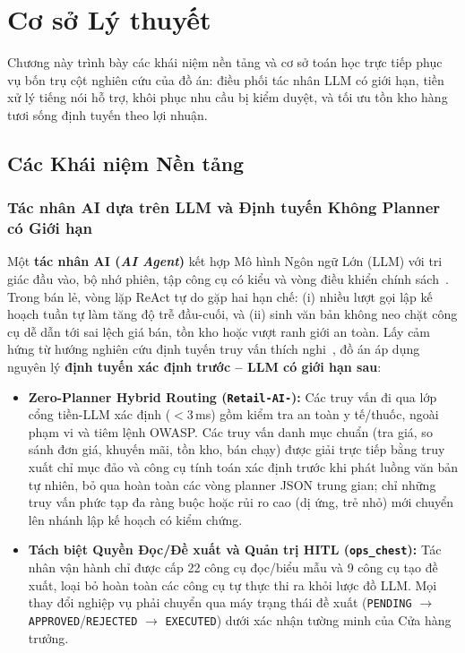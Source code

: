 \chapter{Cơ sở Lý thuyết}

Chương này trình bày các khái niệm nền tảng và cơ sở toán học trực tiếp phục vụ bốn trụ cột nghiên cứu của đồ án: điều phối tác nhân LLM có giới hạn, tiền xử lý tiếng nói hỗ trợ, khôi phục nhu cầu bị kiểm duyệt, và tối ưu tồn kho hàng tươi sống định tuyến theo lợi nhuận.

\section{Các Khái niệm Nền tảng}

\subsection*{Tác nhân AI dựa trên LLM và Định tuyến Không Planner có Giới hạn}
Một \textbf{tác nhân AI (\emph{AI Agent})} kết hợp Mô hình Ngôn ngữ Lớn (LLM) với tri giác đầu vào, bộ nhớ phiên, tập công cụ có kiểu và vòng điều khiển chính sách~\cite{yao2023react,schick2023toolformer}. Trong bán lẻ, vòng lặp ReAct tự do gặp hai hạn chế: (i) nhiều lượt gọi lập kế hoạch tuần tự làm tăng độ trễ đầu-cuối, và (ii) sinh văn bản không neo chặt công cụ dễ dẫn tới sai lệch giá bán, tồn kho hoặc vượt ranh giới an toàn. Lấy cảm hứng từ hướng nghiên cứu định tuyến truy vấn thích nghi~\cite{chen2023frugalgpt,ong2024routellm}, đồ án áp dụng nguyên lý \textbf{định tuyến xác định trước -- LLM có giới hạn sau}:
\begin{itemize}
    \item \textbf{Zero-Planner Hybrid Routing (\texttt{Retail-AI-}):} Các truy vấn đi qua lớp cổng tiền-LLM xác định ($<3$\,ms) gồm kiểm tra an toàn y tế/thuốc, ngoài phạm vi và tiêm lệnh OWASP. Các truy vấn danh mục chuẩn (tra giá, so sánh đơn giá, khuyến mãi, tồn kho, bán chạy) được giải trực tiếp bằng truy xuất chỉ mục đảo và công cụ tính toán xác định trước khi phát luồng văn bản tự nhiên, bỏ qua hoàn toàn các vòng planner JSON trung gian; chỉ những truy vấn phức tạp đa ràng buộc hoặc rủi ro cao (dị ứng, trẻ nhỏ) mới chuyển lên nhánh lập kế hoạch có kiểm chứng.
    \item \textbf{Tách biệt Quyền Đọc/Đề xuất và Quản trị HITL (\texttt{ops\_chest}):} Tác nhân vận hành chỉ được cấp 22 công cụ đọc/biểu mẫu và 9 công cụ tạo đề xuất, loại bỏ hoàn toàn các công cụ tự thực thi ra khỏi lược đồ LLM. Mọi thay đổi nghiệp vụ phải chuyển qua máy trạng thái đề xuất (\texttt{PENDING} $\to$ \texttt{APPROVED}/\texttt{REJECTED} $\to$ \texttt{EXECUTED}) dưới xác nhận tường minh của Cửa hàng trưởng.
\end{itemize}

